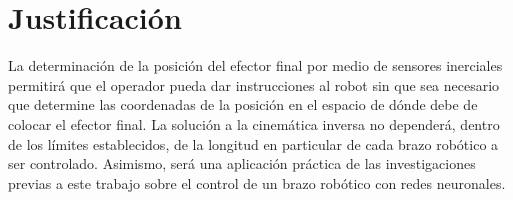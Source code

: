 \section{Justificación}

La determinación de la posición del efector final por medio de sensores inerciales permitirá que el operador pueda dar instrucciones al robot sin que sea necesario que determine las coordenadas de la posición en el espacio de dónde debe de colocar el efector final. La solución a la cinemática inversa no dependerá, dentro de los límites establecidos, de la longitud en particular de cada brazo robótico a ser controlado. Asimismo, será una aplicación práctica de las investigaciones previas a este trabajo sobre el control de un brazo robótico con redes neuronales.
